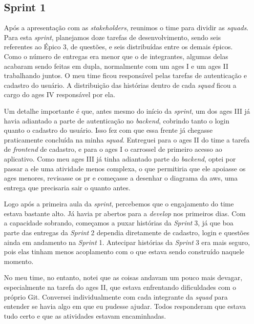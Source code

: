 \subsection{Sprint 1}

Após a apresentação com as \textit{stakeholders}, reunimos o time para dividir as \textit{squads}. Para esta \textit{sprint}, planejamos doze tarefas de desenvolvimento, sendo seis referentes ao Épico 3, de questões, e seis distribuídas entre os demais épicos. Como o número de entregas era menor que o de integrantes, algumas delas acabaram sendo feitas em dupla, normalmente com um \ac{ages} I e um \ac{ages} II trabalhando juntos. O meu time ficou responsável pelas tarefas de autenticação e cadastro do usuário. A distribuição das histórias dentro de cada \textit{squad} ficou a cargo do \ac{ages} IV responsável por ela.

Um detalhe importante é que, antes mesmo do início da \textit{sprint}, um dos \ac{ages} III já havia adiantado a parte de autenticação no \textit{backend}, cobrindo tanto o login quanto o cadastro do usuário. Isso fez com que essa frente já chegasse praticamente concluída na minha \textit{squad}. Entreguei para o \ac{ages} II do time a tarefa de \textit{frontend} de cadastro, e para o \ac{ages} I o carrossel de primeiro acesso ao aplicativo. Como meu \ac{ages} III já tinha adiantado parte do \textit{backend}, optei por passar a ele uma atividade menos complexa, o que permitiria que ele apoiasse os \ac{ages} menores, revisasse os \ac{pr} e começasse a desenhar o diagrama da \ac{aws}, uma entrega que precisaria sair o quanto antes.

Logo após a primeira aula da \textit{sprint}, percebemos que o engajamento do time estava bastante alto. Já havia \ac{pr} abertos para a \textit{develop} nos primeiros dias. Com a capacidade sobrando, começamos a puxar histórias da \textit{Sprint} 3, já que boa parte das entregas da \textit{Sprint} 2 dependia diretamente de cadastro, login e questões ainda em andamento na \textit{Sprint} 1. Antecipar histórias da \textit{Sprint} 3 era mais seguro, pois elas tinham menos acoplamento com o que estava sendo construído naquele momento.

No meu time, no entanto, notei que as coisas andavam um pouco mais devagar, especialmente na tarefa do \ac{ages} II, que estava enfrentando dificuldades com o próprio Git. Conversei individualmente com cada integrante da \textit{squad} para entender se havia algo em que eu pudesse ajudar. Todos responderam que estava tudo certo e que as atividades estavam encaminhadas.

